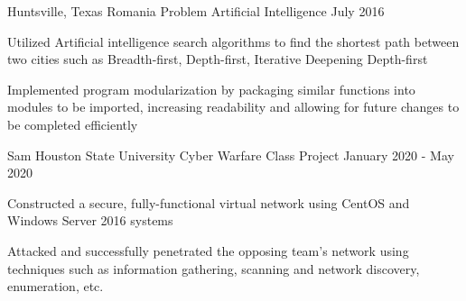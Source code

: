 
\begin{cventries}
	\cventry
	  {Huntsville, Texas} %
      {Romania Problem} %
	  {Artificial Intelligence} %
	  {July 2016} %
	  {
	    \begin{cvitems} %
			\item {Utilized Artificial intelligence search algorithms to find the shortest path between two cities such as Breadth-first, Depth-first, Iterative Deepening Depth-first}
			\item{Implemented program modularization by packaging similar functions into modules to be imported, increasing readability and allowing for future changes to be completed efficiently}
		\end{cvitems}
	  }


	\cventry
	  {Sam Houston State University} %
  	  {Cyber Warfare} %
	  {Class Project} %
	  {January 2020 - May 2020} %
	  {
	    \begin{cvitems} %
			\item {Constructed a secure, fully-functional virtual network using CentOS and Windows Server 2016 systems}
			\item {Attacked and successfully penetrated the opposing team’s network using techniques such as information gathering, scanning and network discovery, enumeration, etc.}
		\end{cvitems}
	  }


\end{cventries}
